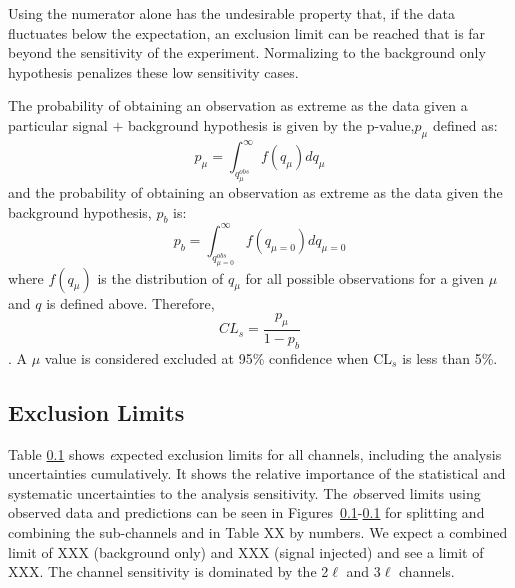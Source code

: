 Using the numerator alone has the undesirable property that, if the data fluctuates below the expectation, an exclusion limit can be reached that is far beyond the sensitivity of the experiment. Normalizing to the background only hypothesis penalizes these low sensitivity cases.

The probability of obtaining an observation as extreme as the data given a particular signal $+$ background hypothesis is given by the p-value,$p_{\mu}$ defined as:
\begin{equation}
 p_{\mu} = \int_{q_{\mu}^{obs}}^{\infty} f(q_{\mu}) dq_{\mu}
\end{equation}
and the probability of obtaining an observation as extreme as the data given the background hypothesis, $p_b$ is:
\begin{equation}
 p_{b} = \int_{q_{\mu=0}^{obs}}^{\infty} f(q_{\mu=0}) dq_{\mu=0}
\end{equation}
where $f(q_{\mu})$ is the distribution of $q_{\mu}$ for all possible observations for a given $\mu$ and $q$ is defined above. Therefore,
\begin{equation}
 CL_{s} = \frac{p_{\mu}}{1-p_b}
\end{equation}
. A $\mu$ value is considered excluded at 95\% confidence when CL$_{s}$ is less than 5\%. 

\subsection{Exclusion Limits}

Table \ref{} shows {\textit expected} exclusion limits for all channels, including the analysis uncertainties cumulatively. It shows the relative importance of the statistical and systematic uncertainties to the analysis sensitivity. The {\textit observed} limits using observed data and predictions can be seen in Figures~\ref{}-\ref{} for splitting and combining the sub-channels and in Table XX by numbers. We expect a combined limit of XXX (background only) and XXX (signal injected) and see a limit of XXX. The channel sensitivity is dominated by the 2$\ell$ and 3$\ell$ channels.


